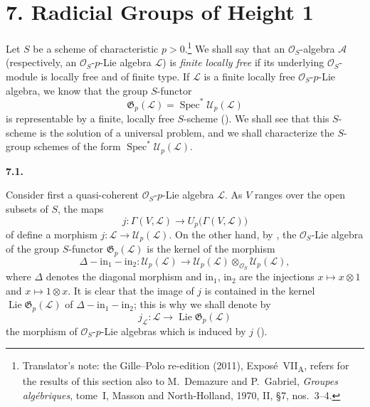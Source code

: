 
\section*{7. Radicial Groups of Height 1}
\label{sga3:VIIA:7}

Let \(S\) be a scheme of characteristic
\(p>0\).\footnote{Translator's note: the Gille--Polo re-edition (2011),
Expos\'e~VII\textsubscript{A}, refers for the results of this section also
to M.~Demazure and P.~Gabriel, \textit{Groupes alg\'ebriques}, tome~I,
Masson and North-Holland, 1970, II, \S7, nos.~3--4.}
We shall say that an \(\mathcal O_S\)-algebra \(\mathcal A\)
(respectively, an \(\mathcal O_S\)-\(p\)-Lie algebra
\(\mathcal L\)) is \emph{finite locally free} if its underlying
\(\mathcal O_S\)-module is locally free and of finite type. If
\(\mathcal L\) is a finite locally free
\(\mathcal O_S\)-\(p\)-Lie algebra, we know that the group
\(S\)-functor
\[
  \mathfrak G_p(\mathcal L)=\operatorname{Spec}^{*}\mathcal U_p(\mathcal L)
\]
is representable by a finite, locally free \(S\)-scheme (). We
shall see that this \(S\)-scheme is the solution of a universal problem,
and we shall characterize the \(S\)-group schemes of the form
\(\operatorname{Spec}^{*}\mathcal U_p(\mathcal L)\).

\medskip
\noindent\textbf{7.1.}
\label{sga3:VIIA:7.1}

Consider first a quasi-coherent \(\mathcal O_S\)-\(p\)-Lie algebra
\(\mathcal L\). As \(V\) ranges over the open subsets of \(S\), the maps
\[
  j:\Gamma(V,\mathcal L)\longrightarrow U_p\bigl(\Gamma(V,\mathcal L)\bigr)
\]
of  define a morphism
\(j:\mathcal L\to\mathcal U_p(\mathcal L)\). On the other hand, by
, the \(\mathcal O_S\)-Lie algebra of the group
\(S\)-functor \(\mathfrak G_p(\mathcal L)\) is the kernel of the morphism
\[
  \Delta-\mathrm{in}_1-\mathrm{in}_2:
  \mathcal U_p(\mathcal L)
  \longrightarrow
  \mathcal U_p(\mathcal L)\otimes_{\mathcal O_S}\mathcal U_p(\mathcal L),
\]
where \(\Delta\) denotes the diagonal morphism and \(\mathrm{in}_1\),
\(\mathrm{in}_2\) are the injections \(x\mapsto x\otimes1\) and
\(x\mapsto1\otimes x\). It is clear that the image of \(j\) is contained in
the kernel \(\operatorname{Lie}\mathfrak G_p(\mathcal L)\) of
\(\Delta-\mathrm{in}_1-\mathrm{in}_2\); this is why we shall denote by
\[
  j_{\mathcal L}:\mathcal L\longrightarrow
  \operatorname{Lie}\mathfrak G_p(\mathcal L)
\]
the morphism of \(\mathcal O_S\)-\(p\)-Lie algebras which is induced by
\(j\) ().

